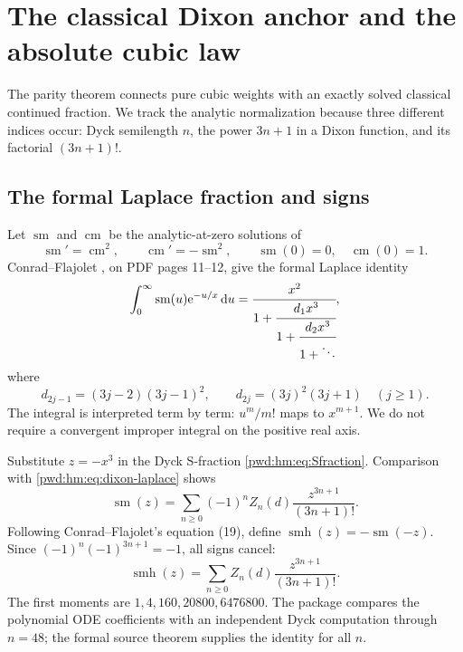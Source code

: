 \documentclass[11pt,letterpaper]{article}
\numberwithin{equation}{section}
\theoremstyle{remark}\newtheorem{remark}[theorem]{Remark}
\begin{document}
\section{The classical Dixon anchor and the absolute cubic law}\label{pwd:hm:sec:dixon}
The parity theorem connects pure cubic weights with an exactly solved classical continued fraction. We track the analytic normalization because three different indices occur: Dyck semilength $n$, the power $3n+1$ in a Dixon function, and its factorial $(3n+1)!$.

\subsection{The formal Laplace fraction and signs}
Let $\operatorname{sm}$ and $\operatorname{cm}$ be the analytic-at-zero solutions of
\[
 \operatorname{sm}'=\operatorname{cm}^2,\qquad
 \operatorname{cm}'=-\operatorname{sm}^2,\qquad
 \operatorname{sm}(0)=0,\quad\operatorname{cm}(0)=1.
\]
Conrad--Flajolet \cite[Theorem 2]{conrad}, on PDF pages 11--12, give the formal Laplace identity
\begin{equation}\label{pwd:hm:eq:dixon-laplace}
 \int_0^\infty\operatorname{sm}(u)\mathrm e^{-u/x}\,\mathrm d u
 =\cfrac{x^2}{1+\cfrac{d_1x^3}{1+\cfrac{d_2x^3}{1+\ddots}}},
\end{equation}
where
\begin{equation}\label{pwd:hm:eq:dixon-weights}
 d_{2j-1}=(3j-2)(3j-1)^2,\qquad
 d_{2j}=(3j)^2(3j+1)\quad(j\ge1).
\end{equation}
The integral is interpreted term by term: $u^m/m!$ maps to $x^{m+1}$. We do not require a convergent improper integral on the positive real axis.

Substitute $z=-x^3$ in the Dyck S-fraction \eqref{pwd:hm:eq:Sfraction}. Comparison with \eqref{pwd:hm:eq:dixon-laplace} shows
\[
 \operatorname{sm}(z)=\sum_{n\ge0}(-1)^nZ_n(d)\frac{z^{3n+1}}{(3n+1)!}.
\]
Following Conrad--Flajolet's equation (19), define
$\operatorname{smh}(z)=-\operatorname{sm}(-z)$. Since
$(-1)^n(-1)^{3n+1}=-1$, all signs cancel:
\begin{equation}\label{pwd:hm:eq:smh-series}
 \operatorname{smh}(z)=\sum_{n\ge0}Z_n(d)\frac{z^{3n+1}}{(3n+1)!}.
\end{equation}
The first moments are $1,4,160,20800,6476800$. The package compares the polynomial ODE coefficients with an independent Dyck computation through $n=48$; the formal source theorem supplies the identity for all $n$.
\end{document}
